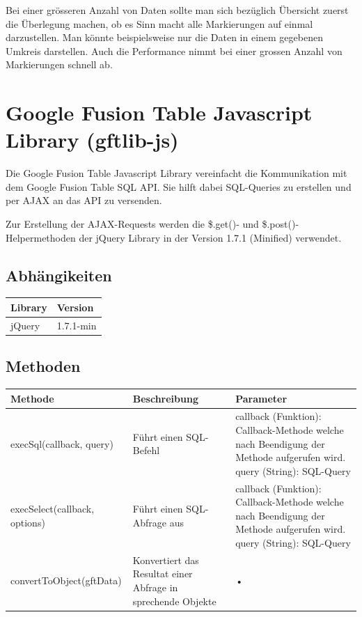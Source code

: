Bei einer grösseren Anzahl von Daten sollte man sich bezüglich Übersicht zuerst die Überlegung machen, ob es Sinn macht alle Markierungen auf einmal darzustellen. Man könnte beispielsweise nur die Daten in einem gegebenen Umkreis darstellen. Auch die Performance nimmt bei einer grossen Anzahl von Markierungen schnell ab.

\section{Google Fusion Table Javascript Library (gftlib-js)}
Die Google Fusion Table Javascript Library vereinfacht die Kommunikation mit dem Google Fusion Table SQL API. Sie hilft dabei SQL-Queries zu erstellen und per AJAX an das API zu versenden.

Zur Erstellung der AJAX-Requests werden die \$.get()- und \$.post()-Helpermethoden der jQuery Library in der Version 1.7.1 (Minified) verwendet.

\subsection{Abhängikeiten}
\begin{tabular}{|l|l|}
\hline 
Library & Version \\ 
\hline 
jQuery & 1.7.1-min \\ 
\hline 
\end{tabular} 

\subsection{Methoden}
\begin{tabular}{|l|p{5cm}|p{5cm}|}
\hline 
Methode & Beschreibung & Parameter \\ 
\hline 
execSql(callback, query) & Führt einen SQL-Befehl & callback (Funktion): Callback-Methode welche nach Beendigung der Methode aufgerufen wird. query (String): SQL-Query \\ 
\hline 
execSelect(callback, options) & Führt einen SQL-Abfrage aus & callback (Funktion): Callback-Methode welche nach Beendigung der Methode aufgerufen wird. query (String): SQL-Query \\ 
\hline 
convertToObject(gftData) & Konvertiert das Resultat einer Abfrage in sprechende Objekte & • \\ 
\hline 
\end{tabular} 
